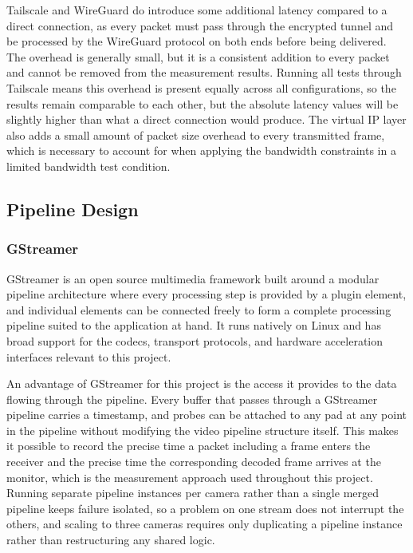 Tailscale and WireGuard do introduce some additional latency compared to a direct connection, as every packet must pass through the encrypted tunnel and be processed by the WireGuard protocol on both ends before being delivered. The overhead is generally small, but it is a consistent addition to every packet and cannot be removed from the measurement results. Running all tests through Tailscale means this overhead is present equally across all configurations, so the results remain comparable to each other, but the absolute latency values will be slightly higher than what a direct connection would produce. The virtual IP layer also adds a small amount of packet size overhead to every transmitted frame, which is necessary to account for when applying the bandwidth constraints in a limited bandwidth test condition.

\vspace{5mm}
\subsection{Pipeline Design}

\subsubsection{GStreamer}

GStreamer is an open source multimedia framework built around a modular pipeline architecture where every processing step is provided by a plugin element, and individual elements can be connected freely to form a complete processing pipeline suited to the application at hand. It runs natively on Linux and has broad support for the codecs, transport protocols, and hardware acceleration interfaces relevant to this project.

An advantage of GStreamer for this project is the access it provides to the data flowing through the pipeline. Every buffer that passes through a GStreamer pipeline carries a timestamp, and probes can be attached to any pad at any point in the pipeline without modifying the video pipeline structure itself. This makes it possible to record the precise time a packet including a frame enters the receiver and the precise time the corresponding decoded frame arrives at the monitor, which is the measurement approach used throughout this project. Running separate pipeline instances per camera rather than a single merged pipeline keeps failure isolated, so a problem on one stream does not interrupt the others, and scaling to three cameras requires only duplicating a pipeline instance rather than restructuring any shared logic.

